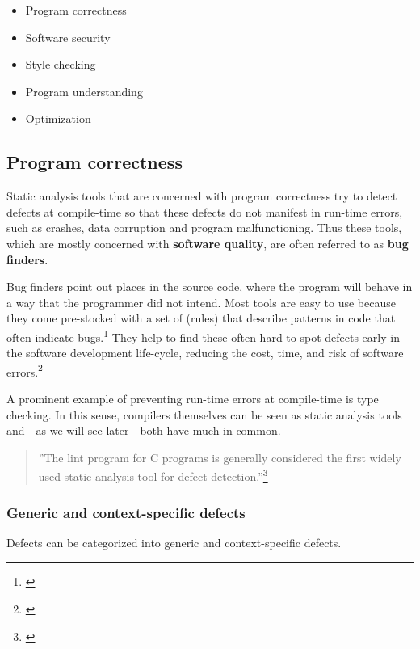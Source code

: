 \begin{itemize}\addtolength{\itemsep}{-0.5\baselineskip}
\item Program correctness
\item Software security
\item Style checking
\item Program understanding
\item Optimization
\end{itemize}

\subsection{Program correctness}

Static analysis tools that are concerned with program correctness try to detect defects at compile-time so that these defects do not manifest in run-time errors, such as crashes, data corruption and program malfunctioning. Thus these tools, which are mostly concerned with \textbf{software quality}, are often referred to as \textbf{bug finders}.

Bug finders point out places in the source code, where the program will behave in a way that the programmer did not intend. Most tools are easy to use because they come pre-stocked with a set of  (rules) that describe patterns in code that often indicate bugs.\footnote{\citep[32]{SecureProgramming}} They help to find these often hard-to-spot defects early in the software development life-cycle, reducing the cost, time, and risk of software errors.\footnote{\citep{CovertySA}}

A prominent example of preventing run-time errors at compile-time is type checking. In this sense, compilers themselves can be seen as static analysis tools and - as we will see later - both have much in common.

\begin{quotation}
''The lint program for C programs is generally considered the first widely used static analysis tool for defect detection.''\footnote{\citep[1]{UsingSAToFindBugs}}
\end{quotation}

\subsubsection{Generic and context-specific defects}

Defects can be categorized into generic and context-specific defects.

